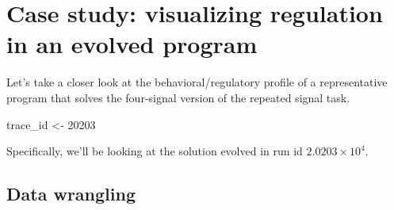 \documentclass[
]{book}
\newenvironment{Shaded}{\begin{snugshade}}{\end{snugshade}}
\newcommand{\DecValTok}[1]{\textcolor[rgb]{0.00,0.00,0.81}{#1}}
\newcommand{\NormalTok}[1]{#1}
\newcommand{\OtherTok}[1]{\textcolor[rgb]{0.56,0.35,0.01}{#1}}
\begin{document}
\hypertarget{case-study-visualizing-regulation-in-an-evolved-program}{%
\section{Case study: visualizing regulation in an evolved program}\label{case-study-visualizing-regulation-in-an-evolved-program}}

Let's take a closer look at the behavioral/regulatory profile of a representative program that solves the four-signal version of the repeated signal task.

\begin{Shaded}
\begin{Highlighting}[]
\NormalTok{trace\_id }\OtherTok{\textless{}{-}} \DecValTok{20203}
\end{Highlighting}
\end{Shaded}

Specifically, we'll be looking at the solution evolved in run id \ensuremath{2.0203\times 10^{4}}.

\hypertarget{data-wrangling}{%
\subsection{Data wrangling}\label{data-wrangling}}
\end{document}
